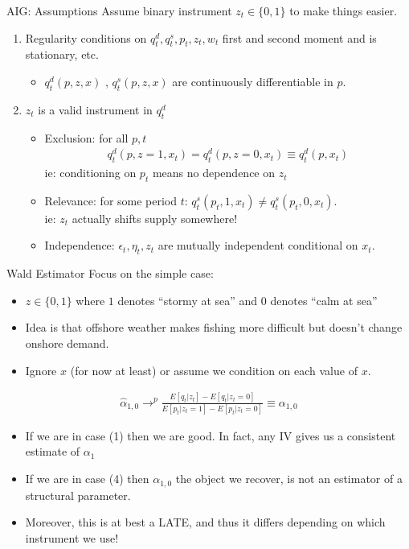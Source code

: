 \documentclass[xcolor=pdftex,dvipsnames,table,mathserif]{beamer}
\begin{document}
\begin{frame}{AIG: Assumptions}
Assume binary instrument $z_{t} \in \{0,1\}$ to make things easier.

\begin{enumerate}
\item Regularity conditions on $q_t^d, q_t^s,p_t,z_t,w_t$ first and second moment and is stationary, etc.
\begin{itemize}
\item  $q_t^d(p,z,x)$ ,  $q_t^s(p,z,x)$ are continuously differentiable in $p$.
\end{itemize}
\item $z_t$ is a valid instrument in $q_t^d$
\begin{itemize}
\item Exclusion: for all $p,t$ 
\begin{eqnarray*}
q_t^d(p,z=1,x_t) = q_t^d(p,z=0,x_t) \equiv q_t^d(p,x_t)
\end{eqnarray*}
ie: conditioning on $p_t$ means no dependence on $z_t$
\item Relevance: for some period $t$: $q_t^s(p_t,1,x_t) \neq q_t^s(p_t,0,x_t)$.\\
ie: $z_t$ actually shifts supply somewhere!
\item Independence: $\epsilon_t, \eta_t, z_t$ are mutually independent conditional on $x_t$.
\end{itemize}
\end{enumerate}
\end{frame}

\begin{frame}{Wald Estimator}
Focus on the simple case:
\begin{itemize}
\item $z \in \{0,1\}$ where $1$ denotes ``stormy at sea'' and 0 denotes ``calm at sea''
\item Idea is that offshore weather makes fishing more difficult but doesn't change onshore demand.
\item Ignore $x$ (for now at least) or assume we condition on each value of $x$.
\end{itemize}
\begin{eqnarray*}
\hat{\alpha}_{1,0}  \rightarrow^p \frac{E[q_t | z_t] - E[q_t | z_t=0]}{E[p_t | z_t=1] - E[p_t | z_t =0]} \equiv \alpha_{1,0}
\end{eqnarray*}
\begin{itemize}
\item If we are in case (1) then we are good. In fact, any IV gives us a consistent estimate of $\alpha_1$
\item If we are in case (4) then $\alpha_{1,0}$ the object we recover, is not an estimator of a structural parameter.
\item Moreover, this is at best a LATE, and thus it differs depending on which instrument we use!
\end{itemize}
\end{frame}
\end{document}
